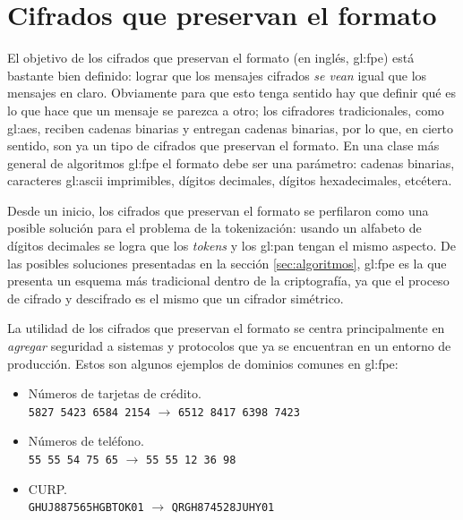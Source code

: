 %
%

\section{Cifrados que preservan el formato}

El objetivo de los cifrados que preservan el formato (en inglés, \gls{gl:fpe})
está bastante bien definido: lograr que los mensajes cifrados \textit{se vean}
igual que los mensajes en claro. Obviamente para que esto tenga sentido hay que
definir qué es lo que hace que un mensaje se parezca a otro; los cifradores
tradicionales, como \gls{gl:aes}, reciben cadenas binarias y entregan cadenas
binarias, por lo que, en cierto sentido, son ya un tipo de cifrados
que preservan el formato. En una clase más general de algoritmos \gls{gl:fpe}
el formato debe ser una parámetro: cadenas binarias, caracteres \gls{gl:ascii}
imprimibles, dígitos decimales, dígitos hexadecimales, etcétera.

Desde un inicio, los cifrados que preservan el formato se perfilaron como
una posible solución para el problema de la tokenización: usando un alfabeto
de dígitos decimales se logra que los \textit{tokens} y los \gls{gl:pan} tengan
el mismo aspecto. De las posibles soluciones presentadas en la sección
\ref{sec:algoritmos}, \gls{gl:fpe} es la que presenta un esquema más tradicional
dentro de la criptografía, ya que el proceso de cifrado y descifrado es el mismo
que un cifrador simétrico.

La utilidad de los cifrados que preservan el formato se centra principalmente
en \textit{agregar} seguridad a sistemas y protocolos que ya se encuentran
en un entorno de producción. Estos son algunos ejemplos de dominios
comunes en \gls{gl:fpe}:

\begin{itemize}

  \item Números de tarjetas de crédito. \\
    \texttt{5827 5423 6584 2154} $ \rightarrow $ \texttt{6512 8417 6398 7423}

  \item Números de teléfono. \\
    \texttt{55 55 54 75 65} $ \rightarrow $ \texttt{55 55 12 36 98}

  \item CURP. \\
    \texttt{GHUJ887565HGBTOK01} $ \rightarrow $ \texttt{QRGH874528JUHY01}

\end{itemize}

